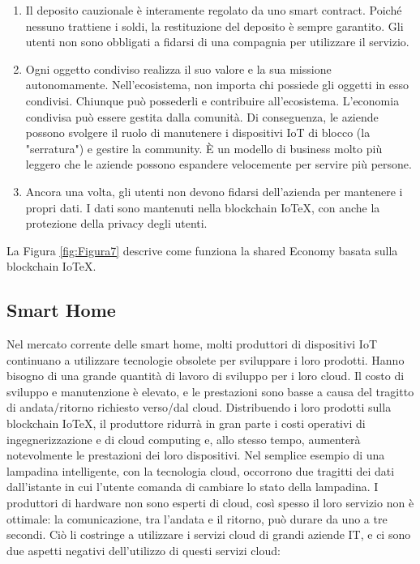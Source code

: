 \begin{enumerate}
    \item Il deposito cauzionale è interamente regolato da uno smart contract. Poiché nessuno trattiene i soldi, la restituzione del deposito è sempre garantito. Gli utenti non sono obbligati a fidarsi di una compagnia per utilizzare il servizio.

    \item Ogni oggetto condiviso realizza il suo valore e la sua missione autonomamente. Nell'ecosistema, non importa chi possiede gli oggetti in esso condivisi. Chiunque può possederli e contribuire all'ecosistema. L'economia condivisa può essere gestita dalla comunità. Di conseguenza, le aziende possono svolgere il ruolo di manutenere i dispositivi IoT di blocco (la "serratura") e gestire la community. È un modello di business molto più leggero che le aziende possono espandere velocemente per servire più persone.

    \item Ancora una volta, gli utenti non devono fidarsi dell'azienda per mantenere i propri dati. I dati sono mantenuti nella blockchain IoTeX, con anche la protezione della privacy degli utenti.
\end{enumerate}

La Figura \ref{fig:Figura7} descrive come funziona la shared Economy basata sulla blockchain IoTeX.

\subsection{Smart Home}

Nel mercato corrente delle smart home, molti produttori di dispositivi IoT continuano a utilizzare tecnologie obsolete per sviluppare i loro prodotti. Hanno bisogno di una grande quantità di lavoro di sviluppo per i loro cloud. Il costo di sviluppo e manutenzione è elevato, e le prestazioni sono basse a causa del tragitto di andata/ritorno richiesto verso/dal cloud. Distribuendo i loro prodotti sulla blockchain IoTeX, il produttore ridurrà in gran parte i costi operativi di ingegnerizzazione e di cloud computing e, allo stesso tempo, aumenterà notevolmente le prestazioni dei loro dispositivi. Nel semplice esempio di una lampadina intelligente, con la tecnologia cloud, occorrono due tragitti dei dati dall'istante in cui l'utente comanda di cambiare lo stato della lampadina. I produttori di hardware non sono esperti di cloud, così spesso il loro servizio non è ottimale: la comunicazione, tra l'andata e il ritorno, può durare da uno a tre secondi. Ciò li costringe a utilizzare i servizi cloud di grandi aziende IT, e ci sono due aspetti negativi dell'utilizzo di questi servizi cloud:

